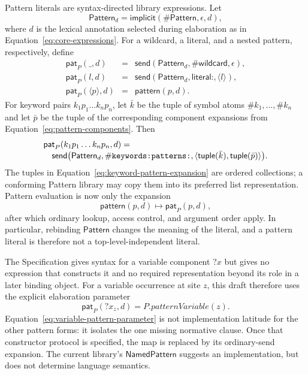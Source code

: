 \documentclass[11pt]{article}
\numberwithin{equation}{section}
\newcommand{\kw}[1]{\ensuremath{\mathsf{#1}}}
\newcommand{\kws}[1]{\ensuremath{\mathsf{#1\mathord{:}}}}
\newcommand{\selsym}[1]{\ensuremath{\mathord{\#}\text{\texttt{#1}}}}
\begin{document}
Pattern literals are syntax-directed library expressions.  Let
\begin{equation}\label{eq:pattern-binding}
 \mathsf{Pattern}_d=
   \kw{implicit}(\#\kw{Pattern},\epsilon,d),
\end{equation}
where $d$ is the lexical annotation selected during elaboration as in
Equation~\eqref{eq:core-expressions}.  For a wildcard, a literal, and a nested
pattern, respectively, define
\begin{equation}\label{eq:pattern-components}
\begin{array}{rcl}
 \mathsf{pat}_P(\_,d)&=&
   \kw{send}(\mathsf{Pattern}_d,\#\kw{wildcard},\epsilon),\\
 \mathsf{pat}_P(l,d)&=&
   \kw{send}(\mathsf{Pattern}_d,\kws{literal},\langle l\rangle),\\
 \mathsf{pat}_P(\langle p\rangle,d)&=&\kw{pattern}(p,d).
\end{array}
\end{equation}
For keyword pairs $k_1p_1\ldots k_np_n$, let $\bar k$ be the tuple of symbol
atoms $\#k_1,\ldots,\#k_n$ and let $\bar p$ be the tuple of the corresponding
component expansions from Equation~\eqref{eq:pattern-components}.  Then
\begin{equation}\label{eq:keyword-pattern-expansion}
\begin{split}
 &\mathsf{pat}_P(k_1p_1\ldots k_np_n,d)=\\[-1mm]
 &\quad\kw{send}\bigl(\mathsf{Pattern}_d,
      \selsym{keywords:patterns:},
      \langle\kw{tuple}(\bar k),\kw{tuple}(\bar p)\rangle\bigr).
\end{split}
\end{equation}
The tuples in Equation~\eqref{eq:keyword-pattern-expansion} are ordered
collections; a conforming Pattern library may copy them into its preferred
list representation.  Pattern evaluation is now only the expansion
\begin{equation}\label{eq:pattern-step}
 \kw{pattern}(p,d)\longmapsto\mathsf{pat}_P(p,d),
\end{equation}
after which ordinary lookup, access control, and argument order apply.  In
particular, rebinding \kw{Pattern} changes the meaning of the literal, and a
pattern literal is therefore not a top-level-independent literal.

The Specification gives syntax for a variable component $?x$ but gives no
expression that constructs it and no required representation beyond its role
in a later binding object.  For a variable occurrence at site $z$, this draft
therefore uses the explicit elaboration parameter
\begin{equation}\label{eq:variable-pattern-parameter}
 \mathsf{pat}_P(?x_z,d)=P.\mathit{patternVariable}(z).
\end{equation}
Equation~\eqref{eq:variable-pattern-parameter} is not implementation latitude
for the other pattern forms: it isolates the one missing normative clause.
Once that constructor protocol is specified, the map is replaced by its
ordinary-send expansion.  The current library's \kw{NamedPattern} suggests an
implementation, but does not determine language semantics.
\end{document}
